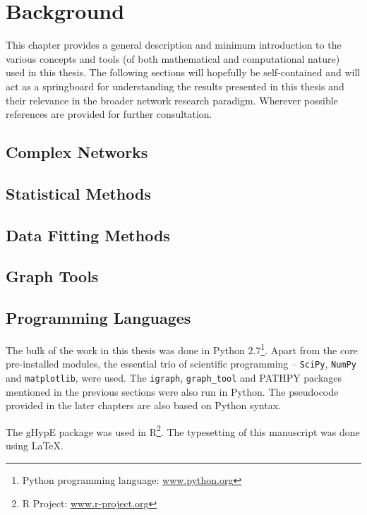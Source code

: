 \chapter{Background}
\label{ch:background}
This chapter provides a general description and minimum introduction to the various concepts and tools (of both mathematical and computational nature) used in this thesis. The following sections will hopefully be self-contained and will act as a springboard for understanding the results presented in this thesis and their relevance in the broader network research paradigm. Wherever possible references are provided for further consultation.

\section{Complex Networks}

\section{Statistical Methods}

\section{Data Fitting Methods}

\section{Graph Tools}

\section{Programming Languages}
The bulk of the work in this thesis was done in Python 2.7\footnote{Python programming language: \href{https://www.python.org/}{www.python.org}}. Apart from the core pre-installed modules, the essential trio of scientific programming -- \lstinline|SciPy|, \lstinline|NumPy| and \lstinline|matplotlib|, were used. The \lstinline|igraph|, \lstinline|graph_tool| and PATHPY packages mentioned in the previous sections were also run in Python. The pseudocode provided in the later chapters are also based on Python syntax.

The gHypE package was used in R\footnote{R Project: \href{https://www.r-project.org/}{www.r-project.org}}. The typesetting of this manuscript was done using \LaTeX. 
